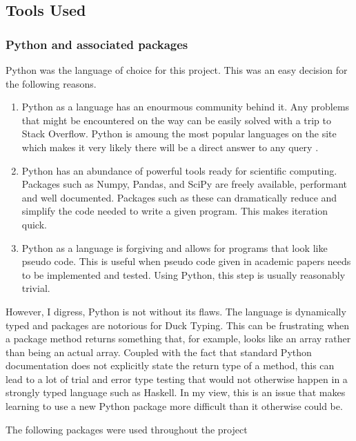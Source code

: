 \documentclass{report}
\begin{document}
\subsection{Tools Used}
\subsubsection{Python and associated packages}

Python was the language of choice for this project. This was an easy decision for the following reasons.

\begin{enumerate}
  \item Python as a language has an enourmous community behind it. Any problems that might be encountered on the way can be easily solved with a trip to Stack Overflow. Python is amoung the most popular languages on the site which makes it very likely there will be a direct answer to any query \cite{website:redmonk-languages}. 
  
  \item Python has an abundance of powerful tools ready for scientific computing. Packages such as Numpy, Pandas, and SciPy are freely available, performant and well documented. Packages such as these can dramatically reduce and simplify the code needed to write a given program. This makes iteration quick.

  \item Python as a language is forgiving and allows for programs that look like pseudo code. This is useful when pseudo code given in academic papers needs to be implemented and tested. Using Python, this step is usually reasonably trivial.

\end{enumerate}


However, I digress, Python is not without its flaws. The language is dynamically typed and packages are notorious for Duck Typing. This can be frustrating when a package method returns something that, for example, looks like an array rather than being an actual array. Coupled with the fact that standard Python documentation does not explicitly state the return type of a method, this can lead to a lot of trial and error type testing that would not otherwise happen in a strongly typed language such as Haskell. In my view, this is an issue that makes learning to use a new Python package more difficult than it otherwise could be.\newline


\noindent The following packages were used throughout the project
\end{document}
